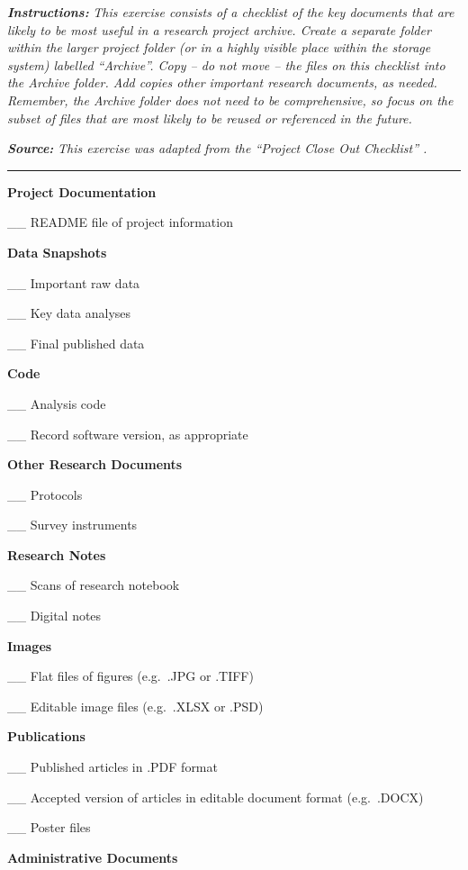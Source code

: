 \documentclass[
]{book}
\begin{document}
\textbf{\emph{Instructions:}} \emph{This exercise consists of a checklist of the key documents that are likely to be most useful in a research project archive. Create a separate folder within the larger project folder (or in a highly visible place within the storage system) labelled ``Archive''. Copy -- do not move -- the files on this checklist into the Archive folder. Add copies other important research documents, as needed. Remember, the Archive folder does not need to be comprehensive, so focus on the subset of files that are most likely to be reused or referenced in the future.}

\textbf{\emph{Source:}} \emph{This exercise was adapted from the ``Project Close Out Checklist'' \citep{briney_project_2020}.}

\begin{center}\rule{0.5\linewidth}{0.5pt}\end{center}

\textbf{Project Documentation}

\_\_ README file of project information

\textbf{Data Snapshots}

\_\_ Important raw data

\_\_ Key data analyses

\_\_ Final published data

\textbf{Code}

\_\_ Analysis code

\_\_ Record software version, as appropriate

\textbf{Other Research Documents}

\_\_ Protocols

\_\_ Survey instruments

\textbf{Research Notes}

\_\_ Scans of research notebook

\_\_ Digital notes

\textbf{Images}

\_\_ Flat files of figures (e.g.~.JPG or .TIFF)

\_\_ Editable image files (e.g.~.XLSX or .PSD)

\textbf{Publications}

\_\_ Published articles in .PDF format

\_\_ Accepted version of articles in editable document format (e.g.~.DOCX)

\_\_ Poster files

\textbf{Administrative Documents}
\end{document}
